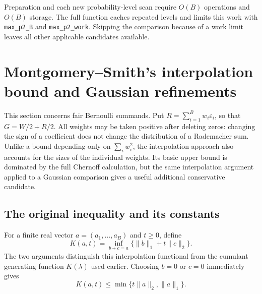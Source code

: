 \documentclass[11pt,letterpaper]{article}
\numberwithin{equation}{section}
\theoremstyle{definition}
\theoremstyle{remark}
\begin{document}
Preparation and each new probability-level scan require $O(B)$ operations
and $O(B)$ storage. The full function caches repeated levels and limits this
work with \texttt{max\_p2\_B} and \texttt{max\_p2\_work}. Skipping the
comparison because of a work limit leaves all other applicable candidates
available.

\section{Montgomery--Smith's interpolation bound and Gaussian refinements}
\label{sec:montgomery-smith}

This section concerns fair Bernoulli summands. Put
$R=\sum_{i=1}^B w_i\varepsilon_i$, so that $G=W/2+R/2$.
All weights may be taken positive after deleting zeros: changing the sign of
a coefficient does not change the distribution of a Rademacher sum.
Unlike a bound depending only on $\sum_iw_i^2$, the interpolation approach
also accounts for the sizes of the individual weights. Its basic upper
bound is dominated by the full Chernoff calculation, but the same
interpolation argument applied to a Gaussian comparison gives a useful
additional conservative candidate.

\subsection{The original inequality and its constants}

For a finite real vector $a=(a_1,\ldots,a_B)$ and $t\ge0$, define
\begin{equation}
 K(a,t)=\inf_{b+c=a}\{\|b\|_1+t\|c\|_2\}.
 \label{eq:ms-K}
\end{equation}
The two arguments distinguish this interpolation functional from the
cumulant generating function $K(\lambda)$ used earlier. Choosing $b=0$ or
$c=0$ immediately gives
\begin{equation}
 K(a,t)\le\min\{t\|a\|_2,\|a\|_1\}.
 \label{eq:ms-K-elementary}
\end{equation}
\end{document}
